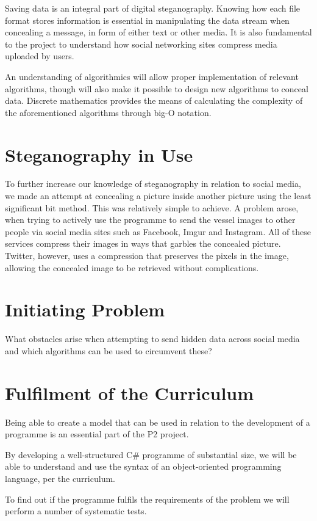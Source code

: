 \documentclass[a4paper,12pt,hidelinks]{article}
\begin{document}
Saving data is an integral part of digital steganography. Knowing how each file format stores information is essential in manipulating the data stream when concealing a message, in form of either text or other media. 
It is also fundamental to the project to understand how social networking sites compress media uploaded by users.

An understanding of algorithmics will allow proper implementation of relevant algorithms, though will also make it possible to design new algorithms to conceal data. Discrete mathematics provides the means of calculating the complexity of the aforementioned algorithms through big-O notation.

	\section*{Steganography in Use}
To further increase our knowledge of steganography in relation to social media, we made an attempt at concealing a picture inside another picture using the least significant bit method. This was relatively simple to achieve. A problem arose, when trying to actively use the programme to send the vessel images to other people via social media sites such as Facebook, Imgur and Instagram. All of these services compress their images in ways that garbles the concealed picture. Twitter, however, uses a compression that preserves the pixels in the image, allowing the concealed image to be retrieved without complications.

	\section*{Initiating Problem}
What obstacles arise when attempting to send hidden data across social media and which algorithms can be used to circumvent these?

	\section*{Fulfilment of the Curriculum}
Being able to create a model that can be used in relation to the development of a programme is an essential part of the P2 project. 

By developing a well-structured C\# programme of substantial size, we will be able to understand and use the syntax of an object-oriented programming language, per the curriculum.

To find out if the programme fulfils the requirements of the problem we will perform a number of systematic tests.
\end{document}
